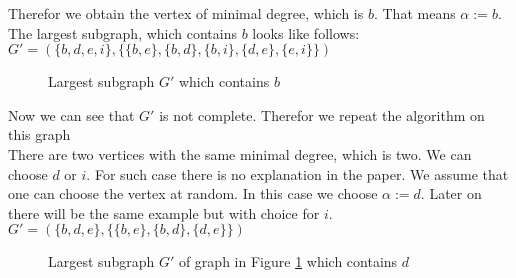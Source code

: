 \documentclass[12pt, xcolor=dvipsnames]{scrartcl}
\theoremstyle{definition}
\theoremstyle{definition}
\begin{document}
          Therefor we obtain the vertex of minimal degree, which is $b$. That means $\alpha := b$. The largest subgraph, which contains $b$ looks like follows:\\
          $G' = (\{b,d,e,i\},\{\{b,e\},\{b,d\},\{b,i\},\{d,e\},\{e,i\}\})$ 
          \begin{figure}[H]
            \centering
            \caption{Largest subgraph $G'$ which contains $b$}
            \label{fig:third-step}
          \end{figure}

          Now we can see that $G'$ is not complete. Therefor we repeat the algorithm on this graph \\
          There are two vertices with the same minimal degree, which is two. We can choose $d$ or $i$. For such case there is no explanation in the paper. We assume that one can choose the vertex at random. In this case we choose $\alpha := d$. Later on there will be the same example but with choice for $i$.
          \\
          $G' = (\{b,d,e\},\{\{b,e\},\{b,d\},\{d,e\}\})$ 

          \begin{figure}[H]
            \centering
            \caption{Largest subgraph $G'$ of graph in Figure \ref{fig:third-step} which contains  $d$ }
          \end{figure}
\end{document}
